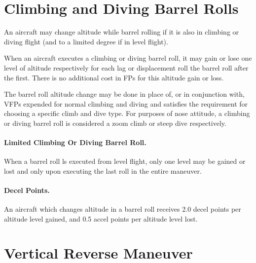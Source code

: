 \begin{advancedrules}

\section{Climbing and Diving Barrel Rolls}

An aircraft may change altitude while barrel rolling if it is also in climbing or diving flight (and to a limited degree if in level flight).

When an aircraft executes a climbing or diving barrel roll, it may gain or lose one level of altitude respectively for each lag or displacement roll  the barrel roll after the first. There is no additional cost in FPs for this altitude gain or loss.

The barrel roll altitude change may be done in place of, or in conjunction with, VFPs expended for normal climbing and diving and satisfies the requirement for choosing a specific climb and dive type. For purposes of nose attitude, a climbing or diving barrel roll is considered a zoom climb or steep dive respectively.


\paragraph{Limited Climbing Or Diving Barrel Roll.} When a barrel roll ls executed from level flight, only one level may be gained or lost and only upon executing the last roll in the entire maneuver.

\paragraph{Decel Points.} An aircraft which changes altitude in a barrel roll receives 2.0 decel points per altitude level gained, and 0.5 accel points per altitude level lost.

\section{Vertical Reverse Maneuver}
\label{rule:vertical-reverses}


\end{advancedrules}
